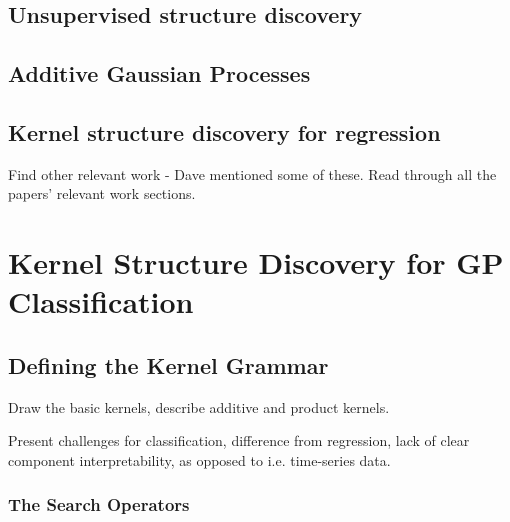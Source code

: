 \documentclass[a4paper,12pt ]{report}
\begin{document}


\section{Unsupervised structure discovery}

\section{Additive Gaussian Processes}

\section{Kernel structure discovery for regression}

Find other relevant work - Dave mentioned some of these. Read through all the papers' relevant work sections. 


\clearpage

\chapter{Kernel Structure Discovery for GP Classification} 

\section{Defining the Kernel Grammar}

Draw the basic kernels, describe additive and product kernels. 

Present challenges for classification, difference from regression, lack of clear component interpretability, as opposed to i.e. time-series data. 

\subsection{The Search Operators}
\end{document}
